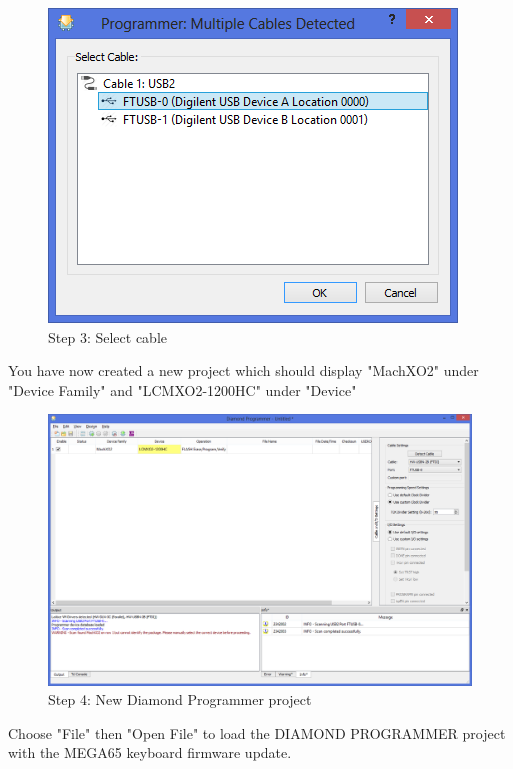 \begin{figure}
  \includegraphics[width=\linewidth]{images/diamond03.png}
  \caption{Step 3: Select cable}
  \label{fig:diamond03}
\end{figure}

You have now created a new project which should display "MachXO2" under "Device Family" and "LCMXO2-1200HC" under "Device"

\begin{figure}
  \includegraphics[width=\linewidth]{images/diamond04.png}
  \caption{Step 4: New Diamond Programmer project}
  \label{fig:diamond04}
\end{figure}

Choose "File"  then "Open File" to load the DIAMOND PROGRAMMER project with the MEGA65 keyboard firmware update.

